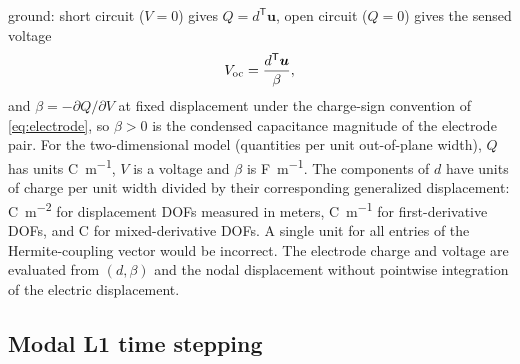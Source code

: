 ground: short circuit ($V=0$) gives $Q=d^{\mathsf T}\bm{u}$, open circuit
($Q=0$) gives the sensed voltage
\begin{equation}
  V_{\rm oc} = \frac{d^{\mathsf T}\bm{u}}{\beta},
  \label{eq:voc}
\end{equation}
and $\beta=-\partial Q/\partial V$ at fixed displacement under the
charge-sign convention of \eqref{eq:electrode}, so $\beta>0$ is the
condensed capacitance magnitude of the electrode pair. For the two-dimensional model (quantities per unit out-of-plane width),
$Q$ has units \si{\coulomb\per\meter}, $V$ is a voltage and $\beta$
is \si{\farad\per\meter}. The components of $d$ have units of charge
per unit width divided by their corresponding generalized displacement:
\si{\coulomb\per\square\meter} for displacement DOFs measured in
meters, \si{\coulomb\per\meter} for first-derivative DOFs, and
\si{\coulomb} for mixed-derivative DOFs. A single unit for all entries
of the Hermite-coupling vector would be incorrect. The electrode charge and voltage are evaluated from $(d,\beta)$
and the nodal displacement without pointwise integration of the electric
displacement.

\FloatBarrier
\subsection{Modal L1 time stepping}
\label{sec:stepping}

